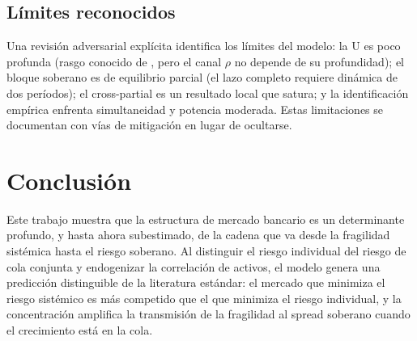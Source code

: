 \documentclass[11pt]{article}
\theoremstyle{plain}
\theoremstyle{definition}
\theoremstyle{remark}
\newcommand{\1}{\mathbf{1}}
\begin{document}
\subsection{Límites reconocidos}
Una revisión adversarial explícita identifica los límites del modelo: la U es poco profunda (rasgo conocido de \citealp{MMR2010}, pero el canal $\rho$ no depende de su profundidad); el bloque soberano es de equilibrio parcial (el lazo completo requiere dinámica de dos períodos); el cross-partial es un resultado local que satura; y la identificación empírica enfrenta simultaneidad y potencia moderada. Estas limitaciones se documentan con vías de mitigación en lugar de ocultarse.

\section{Conclusión}\label{sec:conclusion}

Este trabajo muestra que la estructura de mercado bancario es un determinante profundo, y hasta ahora subestimado, de la cadena que va desde la fragilidad sistémica hasta el riesgo soberano. Al distinguir el riesgo individual del riesgo de cola conjunta y endogenizar la correlación de activos, el modelo genera una predicción distinguible de la literatura estándar: el mercado que minimiza el riesgo sistémico es más competido que el que minimiza el riesgo individual, y la concentración amplifica la transmisión de la fragilidad al spread soberano cuando el crecimiento está en la cola.
\end{document}
